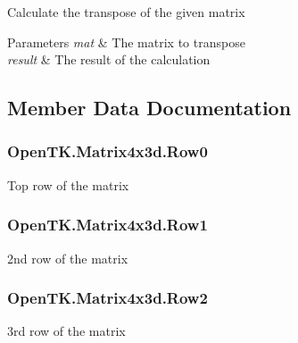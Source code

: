 Calculate the transpose of the given matrix 


\begin{DoxyParams}{Parameters}
{\em mat} & The matrix to transpose\\
\hline
{\em result} & The result of the calculation\\
\hline
\end{DoxyParams}


\subsection{Member Data Documentation}
\hypertarget{struct_open_t_k_1_1_matrix4x3d_a9036054fe57e4af439e4f14baf2753d9}{
\subsubsection[{Row0}]{ Open\-T\-K.\-Matrix4x3d.\-Row0}}\label{struct_open_t_k_1_1_matrix4x3d_a9036054fe57e4af439e4f14baf2753d9}


Top row of the matrix 

\hypertarget{struct_open_t_k_1_1_matrix4x3d_a7fb162bd9a4a2733c6f8553250232d9a}{
\subsubsection[{Row1}]{ Open\-T\-K.\-Matrix4x3d.\-Row1}}\label{struct_open_t_k_1_1_matrix4x3d_a7fb162bd9a4a2733c6f8553250232d9a}


2nd row of the matrix 

\hypertarget{struct_open_t_k_1_1_matrix4x3d_aab272f11a5daf4a0757b636f04dfed30}{
\subsubsection[{Row2}]{ Open\-T\-K.\-Matrix4x3d.\-Row2}}\label{struct_open_t_k_1_1_matrix4x3d_aab272f11a5daf4a0757b636f04dfed30}


3rd row of the matrix 

